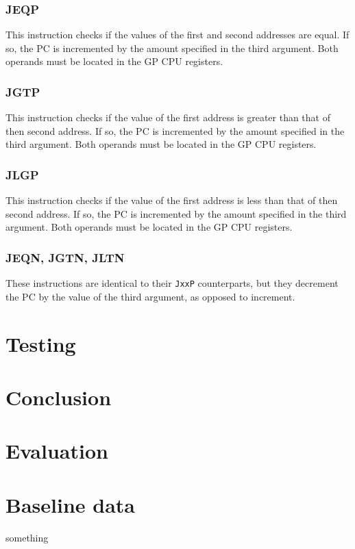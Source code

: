 \documentclass[a4paper,11pt]{article}
\begin{document}
        \subsubsection{JEQP}
            This instruction checks if the values of the first and second addresses are equal. If so, the PC is incremented by the amount specified in the third argument. Both operands must be located in the GP CPU registers.
            
        \subsubsection{JGTP}
            This instruction checks if the value of the first address is greater than that of then second address. If so, the PC is incremented by the amount specified in the third argument. Both operands must be located in the GP CPU registers.
            
        \subsubsection{JLGP}
            This instruction checks if the value of the first address is less than that of then second address. If so, the PC is incremented by the amount specified in the third argument. Both operands must be located in the GP CPU registers.
            
        \subsubsection{JEQN, JGTN, JLTN}
            These instructions are identical to their \lstinline{JxxP} counterparts, but they decrement the PC by the value of the third argument, as opposed to increment.
    
\section{Testing}

\section{Conclusion}
\section{Evaluation}

\begin{appendices}
    \label{appendix}
    \section{Baseline data}
    \label{dat:baseline}
        something
\end{appendices}



\end{document}
